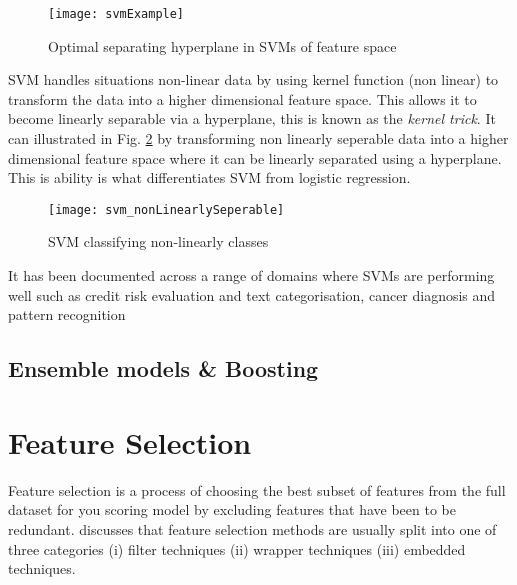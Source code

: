\begin{figure}[H]
	\texttt{[image: svmExample]}
	\caption{Optimal separating hyperplane in SVMs of feature space \\
		\cite[Source:][]{li_adaptive_2011}
	}
	\label{fig:svmExample}
\end{figure}

SVM handles situations non-linear data by using kernel function (non linear) to transform the data into a higher dimensional feature space. This allows it to become linearly separable via a hyperplane, this is known as the \textit{kernel trick}. It can illustrated in Fig. \ref{fig:svm_nonLinearlySeperable} by transforming non linearly seperable data into a higher dimensional feature space where it can be linearly separated using a hyperplane. This is ability is what differentiates SVM from logistic regression.

\begin{figure}[H]
	\texttt{[image: svm\_nonLinearlySeperable]}
	\caption{SVM classifying non-linearly classes \\
		\cite[Source:][]{burges_tutorial_1998}
	}
	\label{fig:svm_nonLinearlySeperable}
\end{figure}

It has been documented across a range of domains where SVMs are performing well such as credit risk evaluation \cite{van_gestel_credit_2009} and text categorisation, cancer diagnosis and pattern recognition \citep{shin_application_2005}

\subsection{Ensemble models \& Boosting} \label{boosting}
\begin{comment}
In 1907, statistician Sir Francis Galton attended a fair in which there was a competition to judge the weight of an Ox. Upon reviewing the 787 predictions made by the competing public, he observed that while there was a 
\end{comment}


\section{Feature Selection}
Feature selection is a process of choosing the best subset of features from the full dataset for you scoring model by excluding features that have been to be redundant. \cite{guyon_introduction_2003} discusses that feature selection methods are usually split into one of three categories (i) filter techniques (ii) wrapper techniques (iii) embedded techniques. 

